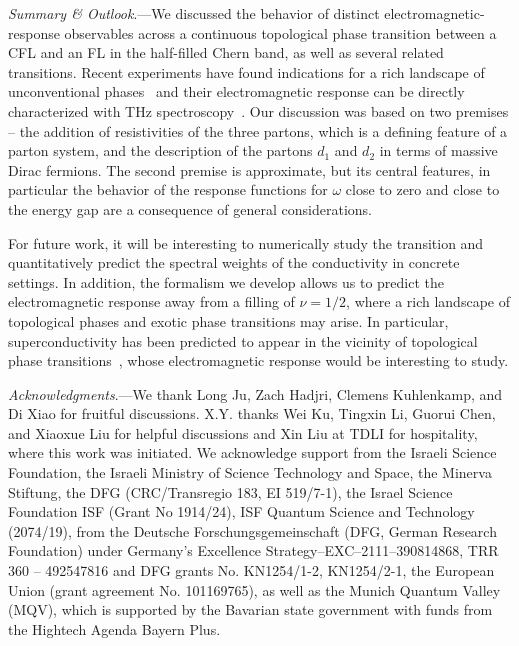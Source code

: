 \documentclass[aps,prl,twocolumn,superscriptaddress,floatfix, 10pt,longbibliography, nofootinbib]{revtex4-2}
\begin{document}
{\it Summary \& Outlook}.---We discussed the behavior of distinct electromagnetic-response observables across a continuous topological phase transition between a CFL and an FL in the half-filled Chern band, as well as several related transitions. Recent experiments have found indications for a rich landscape of unconventional phases~\cite{cai_signatures_2023,park_observation_2023,xu_observation_2023,zeng_thermodynamic_2023, xu_signatures_2025, lu_fractional_2024,han_large_2024,han_signatures_2025,lu_extended_2025, liu_fractional_2025} and their electromagnetic response can be directly characterized with THz spectroscopy~\cite{xu_electronic_2024,chen_direct_2025, chen_terahertz_2025, pierce_imaging_2025, xu_plasmon_2026}.
Our discussion was based on two premises -- the addition of resistivities of the three partons, which is a defining feature of a parton system, and the description of the partons $d_1$ and $d_2$ in terms of massive Dirac fermions. The second premise is approximate, but its central features, in particular the behavior of the response functions for $\omega$ close to zero and close to the energy gap are a consequence of general considerations.

For future work, it will be interesting to numerically study the transition and quantitatively predict the spectral weights of the conductivity in concrete settings. In addition, the formalism we develop allows us to predict the electromagnetic response away from a filling of $\nu=1/2$, where a rich landscape of topological phases and exotic phase transitions may arise. In particular, superconductivity has been predicted to appear in the vicinity of topological phase transitions~\cite {divic_anyon_2025, pichler_microscopic_2025, kuhlenkamp_robust_2025, chen_topological_2025}, whose electromagnetic response would be interesting to study.


\begin{acknowledgments}
{\it Acknowledgments}.---We thank Long Ju, Zach Hadjri, Clemens Kuhlenkamp, and Di Xiao for fruitful discussions. X.Y. thanks Wei Ku, Tingxin Li, Guorui Chen, and Xiaoxue Liu for helpful discussions and Xin Liu at TDLI for hospitality, where this work was initiated. We acknowledge support from the Israeli Science Foundation, the Israeli Ministry of Science Technology and Space, the Minerva Stiftung, the
DFG (CRC/Transregio 183, EI 519/7-1), the Israel Science Foundation ISF (Grant No 1914/24), ISF Quantum Science and Technology (2074/19), from the Deutsche Forschungsgemeinschaft (DFG, German Research Foundation) under Germany’s Excellence Strategy--EXC--2111--390814868, TRR 360 – 492547816 and DFG grants No. KN1254/1-2, KN1254/2-1, the European Union (grant agreement No. 101169765), as well as the Munich Quantum Valley (MQV), which is supported by the Bavarian state government with funds from the Hightech Agenda Bayern Plus.
\end{acknowledgments}
\end{document}
